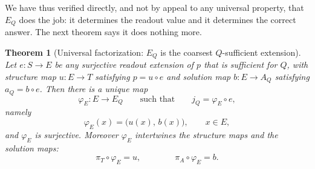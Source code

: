 \documentclass[11pt,reqno]{amsart}
\theoremstyle{plain}
\newtheorem{theorem}{Theorem}[section]
\theoremstyle{definition}
\newcommand{\Src}{S}
\newcommand{\Rdt}{T}
\begin{document}
We have thus verified directly, and not by appeal to any universal property, that $E_Q$ does the
job: it determines the readout value and it determines the correct answer. The next theorem says
it does nothing more.

\begin{theorem}[Universal factorization: $E_Q$ is the coarsest $Q$-sufficient
extension]\label{thm:universal}
Let $e\colon\Src\to E$ be \emph{any} surjective readout extension of $p$ that is sufficient for
$Q$, with structure map $u\colon E\to\Rdt$ satisfying $p=u\circ e$ and solution map
$b\colon E\to A_Q$ satisfying $a_Q=b\circ e$. Then there is a \emph{unique} map
\begin{equation}\label{eq:phiE}
\varphi_E\colon E\longrightarrow E_Q
\qquad\text{such that}\qquad
j_Q=\varphi_E\circ e,
\end{equation}
namely
\begin{equation}\label{eq:phiE-formula}
\varphi_E(x)=\bigl(u(x),\,b(x)\bigr),
\qquad x\in E,
\end{equation}
and $\varphi_E$ is surjective. Moreover $\varphi_E$ intertwines the structure maps and the
solution maps:
\begin{equation}\label{eq:phiE-intertwine}
\pi_\Rdt\circ\varphi_E=u,
\qquad\qquad
\pi_A\circ\varphi_E=b .
\end{equation}
\end{theorem}
\end{document}

